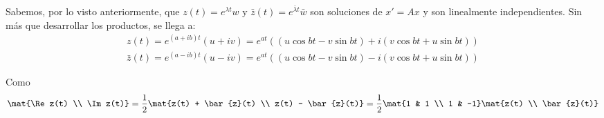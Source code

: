 \documentclass[../main.tex]{subfiles}
\begin{document}
  Sabemos, por lo visto anteriormente, que \(z(t) = e^{\lambda t} w\) y
  \(\bar{z}(t) = e^{\bar{\lambda} t} \bar{w}\) son soluciones de \(x' = Ax\) y
  son linealmente independientes. Sin más que desarrollar los productos, se
  llega a:
  \begin{gather*}
    z(t) = e^{(a+ib)t} (u+iv) = e^{at}\left( (u\cos bt - v\sin bt) + i(v\cos bt + u\sin bt) \right) \\
    \bar{z}(t) = e^{(a-ib)t} (u-iv) = e^{at}\left( (u\cos bt - v\sin bt) - i(v\cos bt + u\sin bt) \right)
  \end{gather*}

  Como
  \[\mat{\Re z(t) \\ \Im z(t)} = \frac{1}{2} \mat{z(t) + \bar{z}(t) \\
      z(t) - \bar{z}(t)} = \frac{1}{2}\mat{1 & 1 \\ 1 & -1}\mat{z(t) \\
      \bar{z}(t)} \]
\end{document}

